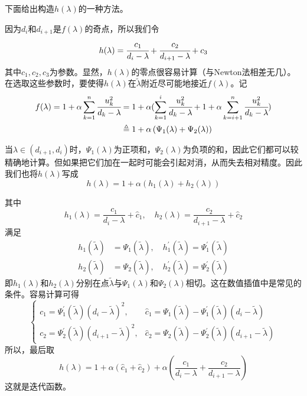 \documentclass[notheorems,serif]{beamer}
\begin{document}
\begin{frame}

下面给出构造$h(\lambda)$的一种方法。

因为$d_i$和$d_{i+1}$是$f(\lambda)$的奇点，所以我们令$$h(\lambda)=\cfrac{c_1}{d_i-\lambda}+\cfrac{c_2}{d_{i+1}-\lambda}+c_3$$
其中$c_1,c_2,c_3$为参数。显然，$h(\lambda)$的零点很容易计算（与Newton法相差无几）。在选取这些参数时，要使得$h(\lambda)$在$\tilde{\lambda}$附近尽可能地接近$f(\lambda)$。记$$\begin{aligned}
f(\lambda)=1+\alpha \sum_{k=1}^n \cfrac{u_k^2}{d_k-\lambda}&=1+\alpha (\sum_{k=1}^i \cfrac{u_k^2}{d_k-\lambda}+1+\alpha \sum_{k=i+1}^n \cfrac{u_k^2}{d_k-\lambda})\\&\triangleq 1+\alpha\left(\Psi_{1}(\lambda)+\Psi_{2}(\lambda)\right)
\end{aligned}$$

当$\lambda \in (d_{i+1},d_i)$时，$\Psi_{1}(\lambda)$为正项和，$\Psi_{2}(\lambda)$为负项的和，因此它们都可以较精确地计算。但如果把它们加在一起时可能会引起对消，从而失去相对精度。因此我们也将$h(\lambda)$写成$$h(\lambda)=1+\alpha(h_1(\lambda)+h_2(\lambda))$$
\end{frame}
\begin{frame}

其中$$
h_{1}(\lambda)=\frac{c_{1}}{d_{i}-\lambda}+\hat{c}_{1}, \quad h_{2}(\lambda)=\frac{c_{2}}{d_{i+1}-\lambda}+\hat{c}_{2}
$$
满足$$
\begin{aligned} h_{1}(\tilde{\lambda}) &=\Psi_{1}(\tilde{\lambda}), \quad h_{1}^{\prime}(\tilde{\lambda})=\Psi_{1}^{\prime}(\tilde{\lambda}) \\ h_{2}(\tilde{\lambda}) &=\Psi_{2}(\tilde{\lambda}), \quad h_{2}^{\prime}(\tilde{\lambda})=\Psi_{2}^{\prime}(\tilde{\lambda}) \end{aligned}
$$
即$h_{1}(\lambda)$和$h_{2}(\lambda)$分别在点$\tilde{\lambda}$与$\Psi_{1}(\lambda)$和$\Psi_{2}(\lambda)$相切。这在数值插值中是常见的条件。容易计算可得\begin{equation}
\left\{\begin{array}{ll}{c_{1}=\Psi_{1}^{\prime}(\tilde{\lambda})\left(d_{i}-\tilde{\lambda}\right)^{2},} & {\hat{c}_{1}=\Psi_{1}(\tilde{\lambda})-\Psi_{1}^{\prime}(\tilde{\lambda})\left(d_{i}-\tilde{\lambda}\right)} \\ {c_{2}=\Psi_{2}^{\prime}(\tilde{\lambda})\left(d_{i+1}-\tilde{\lambda}\right)^{2},} & {\hat{c}_{2}=\Psi_{2}(\tilde{\lambda})-\Psi_{2}^{\prime}(\tilde{\lambda})\left(d_{i+1}-\tilde{\lambda}\right)}\end{array}\right.
\label{equation5.3}
\end{equation}
所以，最后取\begin{equation}
h(\lambda)=1+\alpha\left(\hat{c}_{1}+\hat{c}_{2}\right)+\alpha\left(\frac{c_{1}}{d_{i}-\lambda}+\frac{c_{2}}{d_{i+1}-\lambda}\right)
\label{equation5.4}
\end{equation}
这就是迭代函数。
\end{frame}
\end{document}
